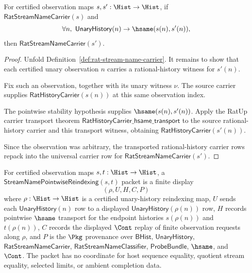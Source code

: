 \begin{theorem}
\label{thm:rat-stream-name-carrier-pointwise-hsame-transport}
For certified observation maps $s,s':\Hist\to\Hist$, if
$\mathsf{RatStreamNameCarrier}(s)$ and
$$
\forall n,\ \mathsf{UnaryHistory}(n)\to\hsame(s(n),s'(n)),
$$
then $\mathsf{RatStreamNameCarrier}(s')$.
\end{theorem}
\begin{proof}
Unfold Definition~\ref{def:rat-stream-name-carrier}. It remains to show that
each certified unary observation $n$ carries a rational-history witness for
$s'(n)$.

Fix such an observation, together with its unary witness $\nu$. The source
carrier supplies $\mathsf{RatHistoryCarrier}(s(n))$ at this same observation
index.

The pointwise stability hypothesis supplies $\hsame(s(n),s'(n))$. Apply the
RatUp carrier transport theorem
$\mathsf{RatHistoryCarrier\_hsame\_transport}$ to the source
rational-history carrier and this transport witness, obtaining
$\mathsf{RatHistoryCarrier}(s'(n))$.

Since the observation was arbitrary, the transported rational-history carrier
rows repack into the universal carrier row for
$\mathsf{RatStreamNameCarrier}(s')$.
\end{proof}

\begin{definition}
\label{def:streamname-pointwise-reindexing}
For certified observation maps $s,t:\Hist\to\Hist$, a $\mathsf{StreamNamePointwiseReindexing}(s,t)$ packet is a finite display
$$
(\rho,U,H,C,P)
$$
where $\rho:\Hist\to\Hist$ is a certified unary-history reindexing map, $U$ sends each $\mathsf{UnaryHistory}(n)$ row to a displayed $\mathsf{UnaryHistory}(\rho(n))$ row, $H$ records pointwise $\hsame$ transport for the endpoint histories $s(\rho(n))$ and $t(\rho(n))$, $C$ records the displayed $\Cont$ replay of finite observation requests along $\rho$, and $P$ is the $\Pkg$ provenance over $\mathsf{BHist}$, $\mathsf{UnaryHistory}$, $\mathsf{RatStreamNameCarrier}$, $\mathsf{RatStreamNameClassifier}$, $\mathsf{ProbeBundle}$, $\hsame$, and $\Cont$. The packet has no coordinate for host sequence equality, quotient stream equality, selected limits, or ambient completion data.
\end{definition}

